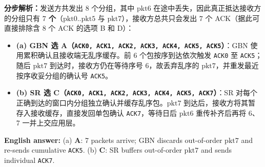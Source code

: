 \textbf{分步解析：}发送方共发出 $8$ 个分组，其中 $\mathrm{pkt6}$ 在途中丢失，因此真正抵达接收方的分组只有 \textbf{$7$ 个}（$\mathrm{pkt0}..\mathrm{pkt5}$ 与 $\mathrm{pkt7}$），接收方总共只会发出 $7$ 个 ACK（据此可直接排除含 8 个 ACK 的选项 B 和 D）：
\begin{itemize}
\item \textbf{(a) GBN 选 A（\texttt{ACK0, ACK1, ACK2, ACK3, ACK4, ACK5, ACK5}）}：GBN 使用累积确认且接收端无乱序缓存。前 6 个包按序到达依次触发 \texttt{ACK0} 至 \texttt{ACK5}；随后 $\mathrm{pkt7}$ 到达时，接收方仍在等待序号 $6$，故丢弃乱序的 $\mathrm{pkt7}$，并重发最近按序收妥分组的确认号 \texttt{ACK5}。
\item \textbf{(b) SR 选 C（\texttt{ACK0, ACK1, ACK2, ACK3, ACK4, ACK5, ACK7}）}：SR 对每个正确到达的窗口内分组独立确认并缓存乱序包。$\mathrm{pkt7}$ 到达后，接收方将其暂存入接收缓存，直接发回单包确认 \texttt{ACK7}，等待日后 $\mathrm{pkt6}$ 重传补齐后再将 6、7 一并上交应用层。
\end{itemize}

\textbf{English answer:} (a) \textbf{A}: 7 packets arrive; GBN discards out-of-order $\mathrm{pkt7}$ and re-sends cumulative \texttt{ACK5}. (b) \textbf{C}: SR buffers out-of-order $\mathrm{pkt7}$ and sends individual \texttt{ACK7}.



